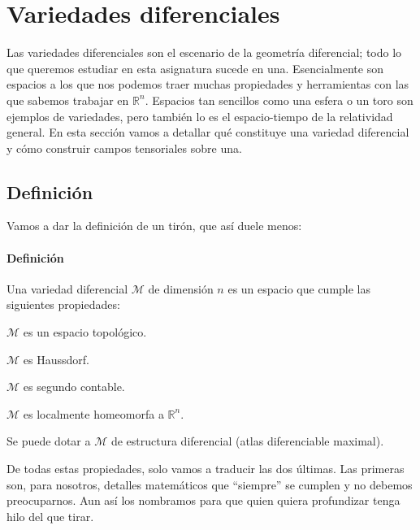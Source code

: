 \newpage
\section{Variedades diferenciales}
\label{sec.3variedades}

Las variedades diferenciales son el escenario de la geometría diferencial; todo lo que queremos estudiar en esta asignatura sucede en una. Esencialmente son espacios a los que nos podemos traer muchas propiedades y herramientas con las que sabemos trabajar en \(\mathbb{R}^n\). Espacios tan sencillos como una esfera o un toro son ejemplos de variedades, pero también lo es el espacio-tiempo de la relatividad general. En esta sección vamos a detallar qué constituye una variedad diferencial y cómo construir campos tensoriales sobre una.


\subsection{Definición}
\label{subsec.3definicion}

Vamos a dar la definición de un tirón, que así duele menos:
\paragraph{Definición} Una variedad diferencial \(\mathcal{M}\) de dimensión \(n\) es un espacio que cumple las siguientes propiedades:
\begin{myitemize}
    \item \(\mathcal{M}\) es un espacio topológico. 
    \item \(\mathcal{M}\) es Haussdorf. 
    \item \(\mathcal{M}\) es segundo contable. 
    \item \(\mathcal{M}\) es localmente homeomorfa a \(\mathbb{R}^n\).
    \item Se puede dotar a \(\mathcal{M}\) de estructura diferencial (atlas diferenciable maximal).
\end{myitemize}
De todas estas propiedades, solo vamos a traducir las dos últimas. Las primeras son, para nosotros, detalles matemáticos que ``siempre'' se cumplen y no debemos preocuparnos. Aun así los nombramos para que quien quiera profundizar tenga hilo del que tirar.

